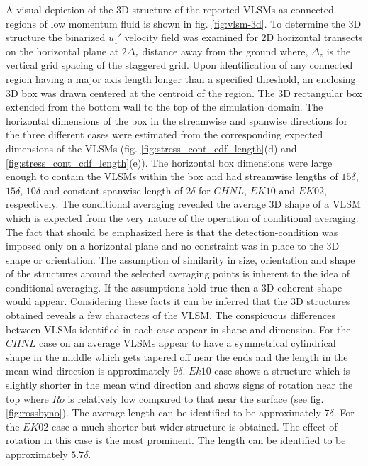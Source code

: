 \documentclass{amsart}
\begin{document}
A visual depiction of the 3D structure of the reported VLSMs as connected regions of low momentum fluid is shown in fig. \ref{fig:vlsm-3d}. To determine the 3D structure the binarized $u_{1}'$ velocity field was examined for 2D horizontal transects on the horizontal plane at $2\Delta_z$ distance away from the ground where, $\Delta_z$ is the vertical grid spacing of the staggered grid. Upon identification of any connected region having a major axis length longer than a specified threshold, an enclosing 3D box was drawn centered at the centroid of the region. The 3D rectangular box extended from the bottom wall to the top of the simulation domain. The horizontal dimensions of the box in the streamwise and spanwise directions for the three different cases were estimated from the corresponding expected dimensions of the VLSMs (fig. \ref{fig:stress_cont_cdf_length}(d) and \ref{fig:stress_cont_cdf_length}(e)). The horizontal box dimensions were large enough to contain the VLSMs within the box and had streamwise lengths of $15\delta$, $15\delta$, $10\delta$ and constant spanwise length of $2\delta$ for $CHNL$, $EK10$ and $EK02$, respectively.  The conditional averaging revealed the average 3D shape of a VLSM which is expected from the very nature of the operation of conditional averaging. The fact that should be emphasized here is that the detection-condition was imposed only on a horizontal plane and no constraint was in place to the 3D shape or orientation. The assumption of similarity in size, orientation and shape of the structures around the selected averaging points is inherent to the idea of conditional averaging. If the assumptions hold true then a 3D coherent shape would appear.  Considering these facts it can be inferred that the 3D structures obtained reveals a few characters of the VLSM.  The conspicuous differences between VLSMs identified in each case appear in shape and dimension. For the $CHNL$ case on an average VLSMs appear to have a symmetrical cylindrical shape in the middle which gets tapered off near the ends and the length in the mean wind direction is approximately $9\delta$. $Ek10$ case shows a structure which is slightly shorter in the mean wind direction and shows signs of rotation near the top where $Ro$ is relatively low compared to that near the surface (see fig. \ref{fig:rossbyno}). The average length can be identified to be approximately $7\delta$. For the $EK02$ case a much shorter but wider structure is obtained. The effect of rotation in this case is the most prominent. The length can be identified to be approximately $5.7\delta$. 
\end{document}
